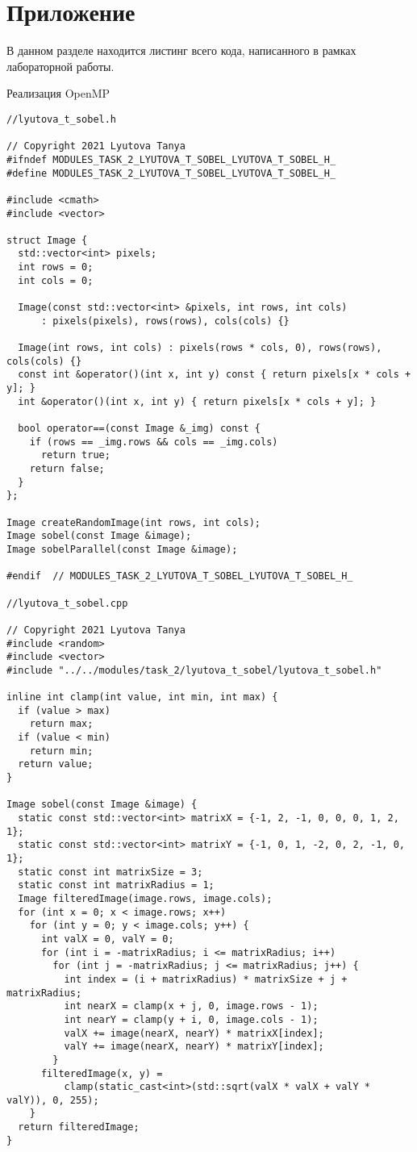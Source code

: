 \documentclass{report}
\begin{document}
\section*{Приложение}
В данном разделе находится листинг всего кода, написанного в рамках лабораторной работы.
\par Реализация OpenMP
\begin{lstlisting}
//lyutova_t_sobel.h

// Copyright 2021 Lyutova Tanya
#ifndef MODULES_TASK_2_LYUTOVA_T_SOBEL_LYUTOVA_T_SOBEL_H_
#define MODULES_TASK_2_LYUTOVA_T_SOBEL_LYUTOVA_T_SOBEL_H_

#include <cmath>
#include <vector>

struct Image {
  std::vector<int> pixels;
  int rows = 0;
  int cols = 0;

  Image(const std::vector<int> &pixels, int rows, int cols)
      : pixels(pixels), rows(rows), cols(cols) {}

  Image(int rows, int cols) : pixels(rows * cols, 0), rows(rows), cols(cols) {}
  const int &operator()(int x, int y) const { return pixels[x * cols + y]; }
  int &operator()(int x, int y) { return pixels[x * cols + y]; }

  bool operator==(const Image &_img) const {
    if (rows == _img.rows && cols == _img.cols)
      return true;
    return false;
  }
};

Image createRandomImage(int rows, int cols);
Image sobel(const Image &image);
Image sobelParallel(const Image &image);

#endif  // MODULES_TASK_2_LYUTOVA_T_SOBEL_LYUTOVA_T_SOBEL_H_

//lyutova_t_sobel.cpp

// Copyright 2021 Lyutova Tanya
#include <random>
#include <vector>
#include "../../modules/task_2/lyutova_t_sobel/lyutova_t_sobel.h"

inline int clamp(int value, int min, int max) {
  if (value > max)
    return max;
  if (value < min)
    return min;
  return value;
}

Image sobel(const Image &image) {
  static const std::vector<int> matrixX = {-1, 2, -1, 0, 0, 0, 1, 2, 1};
  static const std::vector<int> matrixY = {-1, 0, 1, -2, 0, 2, -1, 0, 1};
  static const int matrixSize = 3;
  static const int matrixRadius = 1;
  Image filteredImage(image.rows, image.cols);
  for (int x = 0; x < image.rows; x++)
    for (int y = 0; y < image.cols; y++) {
      int valX = 0, valY = 0;
      for (int i = -matrixRadius; i <= matrixRadius; i++)
        for (int j = -matrixRadius; j <= matrixRadius; j++) {
          int index = (i + matrixRadius) * matrixSize + j + matrixRadius;
          int nearX = clamp(x + j, 0, image.rows - 1);
          int nearY = clamp(y + i, 0, image.cols - 1);
          valX += image(nearX, nearY) * matrixX[index];
          valY += image(nearX, nearY) * matrixY[index];
        }
      filteredImage(x, y) =
          clamp(static_cast<int>(std::sqrt(valX * valX + valY * valY)), 0, 255);
    }
  return filteredImage;
}


\end{lstlisting}
\end{document}
